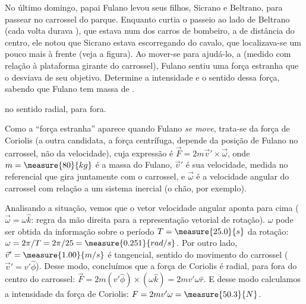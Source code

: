 \begin{question}
	No último domingo, papai Fulano levou seus filhos, Sicrano e Beltrano, para passear no carrossel do parque.
	Enquanto curtia o passeio ao lado de Beltrano (cada volta durava ), que estava num dos carros de bombeiro, a  de distância do centro, ele notou que Sicrano estava escorregando do cavalo, que localizava-se um pouco mais à frente (veja a figura).
	Ao mover-se para ajudá-lo, a  (medido com relação à plataforma girante do carrossel), Fulano sentiu uma força estranha que o desviava de seu objetivo.
	Determine a intensidade e o sentido dessa força, sabendo que Fulano tem massa de .


	\begin{answer}
		 no sentido radial, para fora.
	\end{answer}

	\begin{solution}
		Como a ``força estranha'' aparece quando Fulano \emph{se move}, trata-se da força de Coriolis (a outra candidata, a força centrífuga, depende da posição de Fulano no carrossel, não da velocidade), cuja expressão é $\vec F = 2m\vec v' \times \vec \omega$, onde $m = \measure{80}{kg}$ é a massa do Fulano, $\vec v'$ é sua velocidade, medida no referencial que gira juntamente com o carrossel, e $\vec\omega$ é a velocidade angular do carrossel com relação a um sistema inercial (o chão, por exemplo).

		Analisando a situação, vemos que o vetor velocidade angular aponta para cima ($\vec\omega = \omega\hat k$: regra da mão direita para a representação vetorial de rotação). $\omega$ pode ser obtida da informação sobre o período $T = \measure{25.0}{s}$ da rotação: $\omega = 2\pi/T = 2\pi/25 = \measure{0.251}{rad/s}$. Por outro lado, $\vec v' = \measure{1.00}{m/s}$ é tangencial, sentido do movimento do carrossel ($\vec v' = v'\hat \phi$).
		Desse modo, concluímos que a força de Coriolis é radial, para fora do centro do carrossel: $\vec F = 2m(v'\hat \phi)\times(\omega \hat k) = 2mv'\omega \hat r$. E desse modo calculamos a intensidade da força de Coriolis: $F = 2mv'\omega = \measure{50.3}{N}$.
	\end{solution}
\end{question}